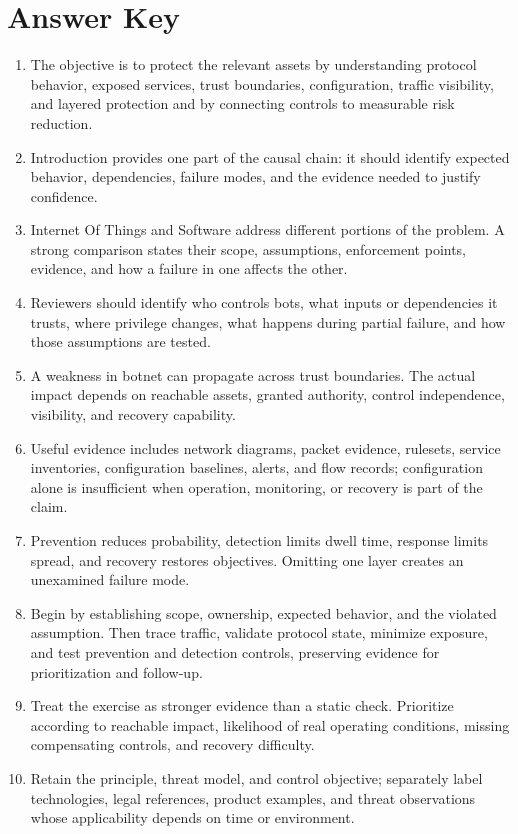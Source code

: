 \documentclass[11pt]{article}
\begin{document}
\section*{Answer Key}
\begin{enumerate}
\item The objective is to protect the relevant assets by understanding protocol behavior, exposed services, trust boundaries, configuration, traffic visibility, and layered protection and by connecting controls to measurable risk reduction.
\item Introduction provides one part of the causal chain: it should identify expected behavior, dependencies, failure modes, and the evidence needed to justify confidence.
\item Internet Of Things and Software address different portions of the problem. A strong comparison states their scope, assumptions, enforcement points, evidence, and how a failure in one affects the other.
\item Reviewers should identify who controls bots, what inputs or dependencies it trusts, where privilege changes, what happens during partial failure, and how those assumptions are tested.
\item A weakness in botnet can propagate across trust boundaries. The actual impact depends on reachable assets, granted authority, control independence, visibility, and recovery capability.
\item Useful evidence includes network diagrams, packet evidence, rulesets, service inventories, configuration baselines, alerts, and flow records; configuration alone is insufficient when operation, monitoring, or recovery is part of the claim.
\item Prevention reduces probability, detection limits dwell time, response limits spread, and recovery restores objectives. Omitting one layer creates an unexamined failure mode.
\item Begin by establishing scope, ownership, expected behavior, and the violated assumption. Then trace traffic, validate protocol state, minimize exposure, and test prevention and detection controls, preserving evidence for prioritization and follow-up.
\item Treat the exercise as stronger evidence than a static check. Prioritize according to reachable impact, likelihood of real operating conditions, missing compensating controls, and recovery difficulty.
\item Retain the principle, threat model, and control objective; separately label technologies, legal references, product examples, and threat observations whose applicability depends on time or environment.
\end{enumerate}
\end{document}
